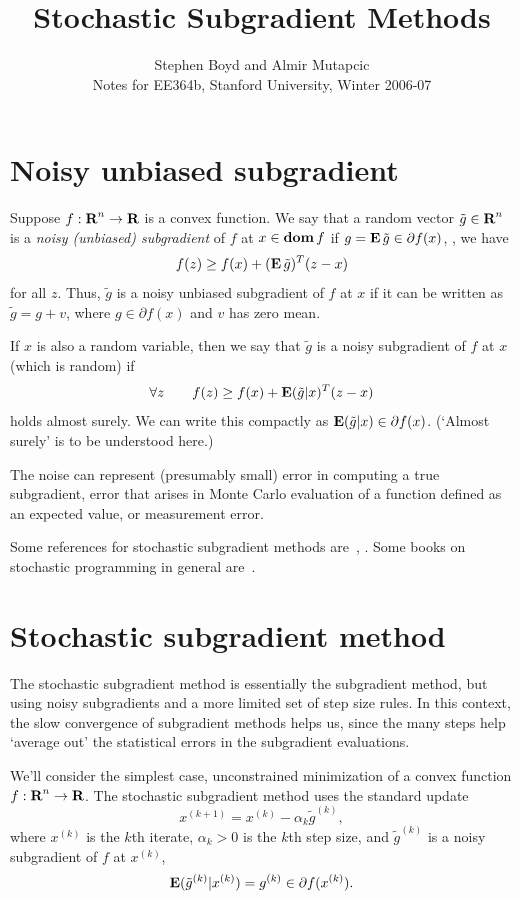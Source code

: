 \documentclass[12pt]{article}
\title{Stochastic Subgradient Methods}
\author{Stephen Boyd and Almir Mutapcic\\
Notes for EE364b, Stanford University, Winter 2006-07}
\begin{document}
\maketitle

\section{Noisy unbiased subgradient}

Suppose $f:{\mbox{\bf R}}^n \rightarrow {\mbox{\bf R}}$ is a convex function.
We say that a random vector $\tilde g \in {\mbox{\bf R}}^n$ is
a \emph{noisy (unbiased) subgradient} of $f$ at $x \in \mathop{\bf dom} f$ if
$g=\mathop{\bf E{}} \tilde g \in \partial f(x)$, \ie, we have
\[
f(z) \geq f(x)+ (\mathop{\bf E{}} \tilde g)^T(z-x)
\]
for all $z$.
Thus, $\tilde g$ is a noisy unbiased subgradient of $f$ at $x$
if it can be written as $\tilde g= g+v$, where $g \in \partial f(x)$ and
$v$ has zero mean.

If $x$ is also a random variable,
then we say that $\tilde g$ is a noisy subgradient of $f$ at $x$
(which is random) if
\[
\forall z \qquad f(z) \geq f(x)+ \mathop{\bf E{}} (\tilde g|x)^T(z-x)
\]
holds almost surely.
We can write this compactly as
$\mathop{\bf E{}} (\tilde g|x) \in \partial f(x)$.
(`Almost surely' is to be understood here.)

The noise can represent (presumably small) error in computing a true
subgradient, error that arises in Monte Carlo evaluation of a function
defined as an expected value, or measurement error.

Some references for stochastic subgradient methods
are~\cite[\S 2.4]{Sho:98}, \cite[Chap.\ 5]{Pol:87}.
Some books on stochastic programming in general
are~\cite{BiL:97,Pre:95,Mar:05}.

\section{Stochastic subgradient method}

The stochastic subgradient method is essentially the subgradient method,
but using noisy subgradients and a more limited set of step size rules.
In this context,
the slow convergence of subgradient methods helps us, since the
many steps help `average out' the statistical errors in the subgradient
evaluations.

We'll consider the simplest case, unconstrained
minimization of a convex function $f:{\mbox{\bf R}}^n \rightarrow {\mbox{\bf R}}$.
The stochastic subgradient method uses the standard update
\[
x^{(k+1)}=x^{(k)}-\alpha_k \tilde g^{(k)},
\]
where $x^{(k)}$ is the $k$th iterate, $\alpha_k > 0$ is the $k$th step
size, and $ \tilde g^{(k)} $ is a noisy subgradient of $f$ at $x^{(k)}$,
\[
\mathop{\bf E{}} (\tilde g^{(k)}|x^{(k)})  = g^{(k)} \in \partial f(x^{(k)}).
\]
\end{document}
